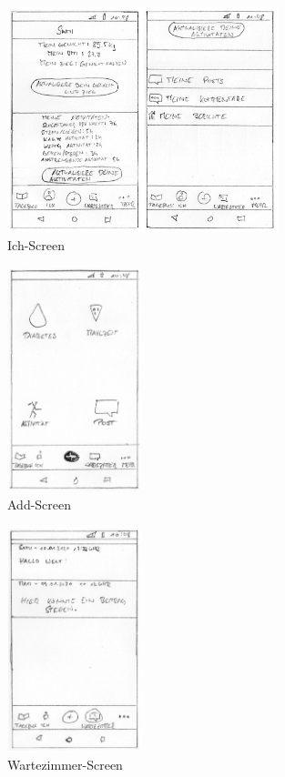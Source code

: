 \begin{figure}[H]
	\centering
	\includegraphics[width=0.7\textwidth]{images/ichscreen.png}
	\captionsetup{justification=centering}
	\caption{Ich-Screen}
	\label{img:ichscreen}
\end{figure}
\begin{figure}[H]
	\centering
	\includegraphics[width=0.35\textwidth]{images/addscreen.png}
	\captionsetup{justification=centering}
	\caption{Add-Screen}
	\label{img:addscreen}
\end{figure}
\begin{figure}[H]
	\centering
	\includegraphics[width=0.35\textwidth]{images/wartezimmerscreen.png}
	\captionsetup{justification=centering}
	\caption{Wartezimmer-Screen}
	\label{img:wartezimmerscreen}
\end{figure}

